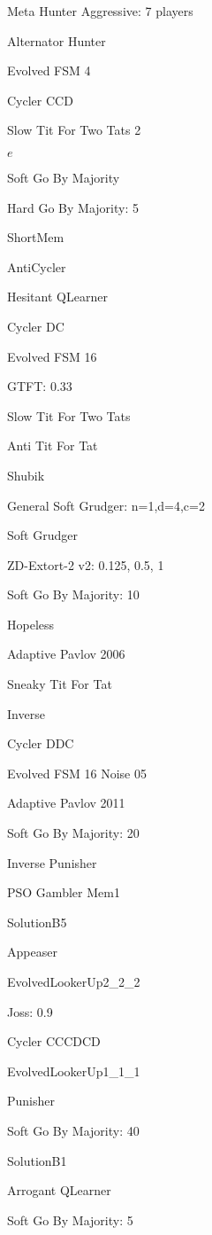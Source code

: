 \item Meta Hunter Aggressive: 7 players
\item Alternator Hunter
\item Evolved FSM 4
\item Cycler CCD
\item Slow Tit For Two Tats 2
\item $e$
\item Soft Go By Majority
\item Hard Go By Majority: 5
\item ShortMem
\item AntiCycler
\item Hesitant QLearner
\item Cycler DC
\item Evolved FSM 16
\item GTFT: 0.33
\item Slow Tit For Two Tats
\item Anti Tit For Tat
\item Shubik
\item General Soft Grudger: n=1,d=4,c=2
\item Soft Grudger
\item ZD-Extort-2 v2: 0.125, 0.5, 1
\item Soft Go By Majority: 10
\item Hopeless
\item Adaptive Pavlov 2006
\item Sneaky Tit For Tat
\item Inverse
\item Cycler DDC
\item Evolved FSM 16 Noise 05
\item Adaptive Pavlov 2011
\item Soft Go By Majority: 20
\item Inverse Punisher
\item PSO Gambler Mem1
\item SolutionB5
\item Appeaser
\item EvolvedLookerUp2\_2\_2
\item Joss: 0.9
\item Cycler CCCDCD
\item EvolvedLookerUp1\_1\_1
\item Punisher
\item Soft Go By Majority: 40
\item SolutionB1
\item Arrogant QLearner
\item Soft Go By Majority: 5
